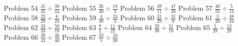 \documentclass{article}
\begin{document}
\hfill \break
Problem 54
\newline
\hfill \break
$\displaystyle \frac{45}{45} \div \frac{38}{44}$
\newline
\hfill \break
Problem 55
\newline
\hfill \break
$\displaystyle \frac{26}{40} \div \frac{18}{3}$
\newline
\hfill \break
Problem 56
\newline
\hfill \break
$\displaystyle \frac{49}{11} \div \frac{47}{38}$
\newline
\hfill \break
Problem 57
\newline
\hfill \break
$\displaystyle \frac{40}{35} \div \frac{5}{14}$
\newline
\hfill \break
Problem 58
\newline
\hfill \break
$\displaystyle \frac{22}{29} \div \frac{6}{24}$
\newline
\hfill \break
Problem 59
\newline
\hfill \break
$\displaystyle \frac{4}{48} \div \frac{24}{3}$
\newline
\hfill \break
Problem 60
\newline
\hfill \break
$\displaystyle \frac{31}{29} \div \frac{31}{8}$
\newline
\hfill \break
Problem 61
\newline
\hfill \break
$\displaystyle \frac{3}{26} \div \frac{48}{44}$
\newline
\hfill \break
Problem 62
\newline
\hfill \break
$\displaystyle \frac{33}{33} \div \frac{50}{18}$
\newline
\hfill \break
Problem 63
\newline
\hfill \break
$\displaystyle \frac{9}{2} \div \frac{11}{22}$
\newline
\hfill \break
Problem 64
\newline
\hfill \break
$\displaystyle \frac{20}{38} \div \frac{31}{18}$
\newline
\hfill \break
Problem 65
\newline
\hfill \break
$\displaystyle \frac{5}{28} \div \frac{13}{28}$
\newline
\hfill \break
Problem 66
\newline
\hfill \break
$\displaystyle \frac{38}{43} \div \frac{46}{40}$
\newline
\hfill \break
Problem 67
\newline
\hfill \break
$\displaystyle \frac{33}{5} \div \frac{16}{30}$
\newline
\hfill \break
\end{document}

